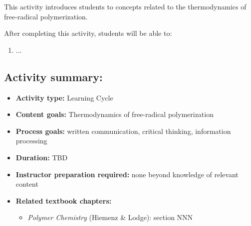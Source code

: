 %
%
%
%

\renewcommand{\figpath}{content/polymchem/freeradical/FRPthermo/figs}
\renewcommand{\labelbase}{FRPthermo}

\begin{activity}

\begin{instructornotes}
	This activity introduces students to concepts related to the thermodynamics of free-radical polymerization.
	
	After completing this activity, students will be able to:
	\begin{enumerate}
		\item ...
	\end{enumerate}
	
	\subsection*{Activity summary:}
	\begin{itemize}
		\item \textbf{Activity type:} Learning Cycle
		\item \textbf{Content goals:} Thermodynamics of free-radical polymerization
		\item \textbf{Process goals:} %
			written communication, critical thinking, information processing
		\item \textbf{Duration:} TBD
		\item \textbf{Instructor preparation required:} none beyond knowledge of relevant content
		\item \textbf{Related textbook chapters:}
			\begin{itemize}
				\item \emph{Polymer Chemistry} (Hiemenz \& Lodge): section NNN
			\end{itemize}
	\end{itemize}
	

\end{instructornotes}
\end{activity}
